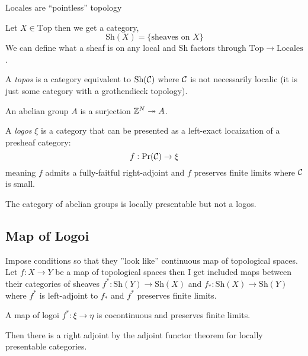 \documentclass[12pt]{article}
\begin{document}
\begin{rmk}
$\mathrm{Locales}$ are ``pointless'' topology 
\end{rmk}

\begin{rmk}
Let $X \in \mathrm{Top}$ then we get a category,
\[ \mathrm{Sh}(X) = \{ \text{sheaves on } X \} \]
We can define what a sheaf is on any local and $\mathrm{Sh}$ factors through $\mathrm{Top} \to \mathrm{Locales}$.  
\end{rmk}

\begin{defn}
A \textit{topos} is a category equivalent to $\mathrm{Sh}(\mathcal{C})$ where $\mathcal{C}$ is not necessarily localic (it is just some category with a grothendieck topology). 
\end{defn}

\begin{rmk}
An abelian group $A$ is a surjection $\mathbb{Z}^N \twoheadrightarrow A$.
\end{rmk}

\begin{defn}
A \textit{logos} $\xi$ is a category that can be presented as a left-exact locaization of a presheaf category:
\[ f : \mathrm{Pr}(\mathcal{C}) \to \xi \]
meaning $f$ admits a fully-faitful right-adjoint and $f$ preserves finite limits where $\mathcal{C}$ is small. 
\end{defn}

\begin{rmk}
The category of abelian groups is locally presentable but not a logos.
\end{rmk}

\subsection{Map of Logoi}

Impose conditions so that they ''look like'' continuous map of topological spaces. Let $f : X \to Y$ be a map of topological spaces then I get included maps between their categories of sheaves $f^* : \mathrm{Sh}(Y) \to \mathrm{Sh}(X)$ and $f_* : \mathrm{Sh}(X) \to \mathrm{Sh}(Y)$ where $f^*$ is left-adjoint to $f_*$ and $f^*$ preserves finite limits. 

\begin{defn}
A map of logoi $f^* : \xi \to \eta$ is cocontinuous and preserves finite limits. 
\end{defn}

\begin{rmk}
Then there is a right adjoint by the adjoint functor theorem for locally presentable categories. 
\end{rmk}
\end{document}

